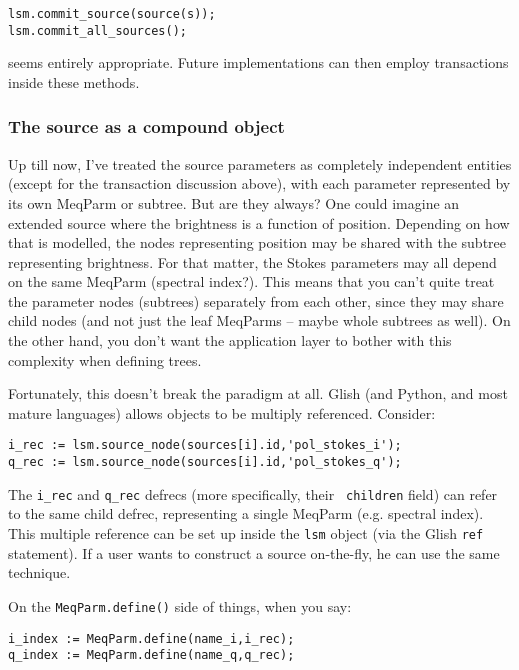 \documentclass[]{lofar}
\begin{document}
\begin{verbatim}
lsm.commit_source(source(s));
lsm.commit_all_sources();
\end{verbatim}
  
  seems entirely appropriate. Future implementations can then employ transactions
  inside these methods.
  
\subsubsection{The source as a compound object}
  
  Up till now, I've treated the source parameters as completely independent
  entities (except for the transaction discussion above), with each parameter
  represented by its own MeqParm or subtree. But are they always? One could
  imagine  an extended source where the brightness is a function of position.
  Depending on how that is modelled, the nodes representing position may be
  shared with the subtree representing brightness. For that matter, the  Stokes
  parameters may all depend on the same MeqParm (spectral index?). This means that
  you can't quite treat the parameter nodes (subtrees) separately from each
  other, since they may share child nodes (and not just the leaf MeqParms --
  maybe whole subtrees as well). On the other hand, you don't want the
  application layer to bother with this complexity when defining trees.
  
  Fortunately, this doesn't break the paradigm at all. Glish (and Python, and
  most mature languages) allows objects to be multiply referenced. Consider:
  
\begin{verbatim}
i_rec := lsm.source_node(sources[i].id,'pol_stokes_i');
q_rec := lsm.source_node(sources[i].id,'pol_stokes_q');
\end{verbatim}
  
  The {\tt i\_rec} and {\tt q\_rec} defrecs (more specifically, their {\tt
  children} field) can refer to the same child defrec, representing a single
  MeqParm (e.g. spectral index). This multiple reference can be set up inside the
  {\tt lsm} object (via the Glish {\tt ref} statement). If a user wants to
  construct a source on-the-fly, he can use the same technique.
  
  On the {\tt MeqParm.define()} side of things, when you say:
  
\begin{verbatim}
i_index := MeqParm.define(name_i,i_rec);
q_index := MeqParm.define(name_q,q_rec);
\end{verbatim}
  
\end{document}
